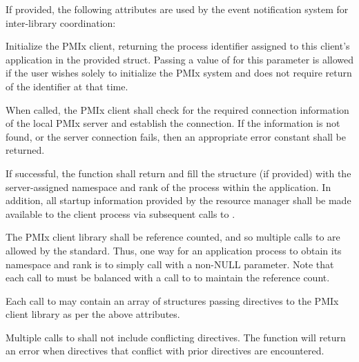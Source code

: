 \vspace{\baselineskip}
If provided, the following attributes are used by the event notification system for inter-library coordination:


\optattrend

\descr

Initialize the \ac{PMIx} client, returning the process identifier assigned to this client's application in the provided  struct.
Passing a value of  for this parameter is allowed if the user wishes solely to initialize the \ac{PMIx} system and does not require return of the identifier at that time.

When called, the \ac{PMIx} client shall check for the required connection information of the local \ac{PMIx} server and establish the connection.
If the information is not found, or the server connection fails, then an appropriate error constant shall be returned.

If successful, the function shall return  and fill the  structure (if provided) with the server-assigned namespace and rank of the process within the application.
In addition, all startup information provided by the resource manager shall be made available to the client process via subsequent calls to .

The \ac{PMIx} client library shall be reference counted, and so multiple calls to  are allowed by the standard.
Thus, one way for an application process to obtain its namespace and rank is to simply call  with a non-NULL  parameter.
Note that each call to  must be balanced with a call to  to maintain the reference count.

Each call to  may contain an array of  structures passing directives to the \ac{PMIx} client library as per the above attributes.

Multiple calls to  shall not include conflicting directives.
The  function will return an error when directives that conflict with prior directives are encountered.

